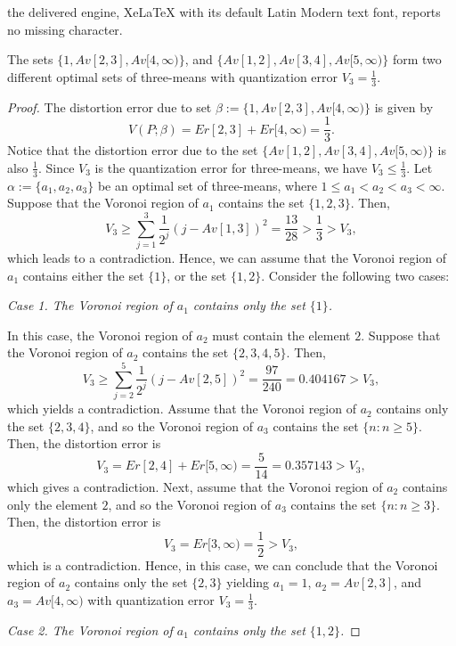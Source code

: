 \documentclass[10pt,a4paper]{amsart}
\newcommand{\ga}{\alpha}
\newcommand{\gb}{\beta}
\newcommand{\set}[1]{\{#1\}}%
\newcommand{\tit}{\textit}%
\begin{document}
the delivered engine, XeLaTeX with its default Latin Modern text font, reports no missing character.
\begin{prop} \label{prop111}
The sets $\set{1, Av[2,3], Av[4, \infty)}$, and $\set{Av[1,2], Av[3,4], Av[5, \infty)}$  form two different optimal sets of three-means with quantization error $V_3=\frac{1}{3}$.
\end{prop}

\begin{proof}
The distortion error due to set $\gb:=\set{1, Av[2,3], Av[4, \infty)}$ is given by
\[V(P; \gb)=Er[2,3]+Er[4, \infty)=\frac 13.\]
Notice that the distortion error due to the set $\set{Av[1,2], Av[3,4], Av[5, \infty)}$ is also $\frac 13$.
Since $V_3$ is the quantization error for three-means, we have $V_3\leq \frac 13$. Let $\ga:=\set{a_1, a_2, a_3}$ be an optimal set of three-means, where $1\leq a_1<a_2<a_3<\infty$. Suppose that the Voronoi region of $a_1$ contains the set $\set{1, 2, 3}$.
Then,
\[V_3\geq \sum_{j=1}^3 \frac 1 {2^j}(j-Av[1,3])^2 =\frac{13}{28}>\frac 13>V_3,\]
which leads to a contradiction. Hence, we can assume that the Voronoi region of $a_1$ contains either the set $\set{1}$, or the set $\set{1,2}$. Consider the following two cases:

\tit{Case 1. The Voronoi region of $a_1$ contains only the set $\set{1}$.}

In this case, the Voronoi region of $a_2$ must contain the element $2$. Suppose that the Voronoi region of $a_2$ contains the set $\set{2, 3, 4, 5}$. Then,
\[V_3\geq  \sum_{j=2}^5\frac 1 {2^j}(j-Av[2,5])^2 =\frac{97}{240}=0.404167>V_3,\]
which yields a contradiction. Assume that the Voronoi region of $a_2$ contains only the set $\set{2,3,4}$, and so the Voronoi region of $a_3$ contains the set $\set{n : n\geq 5}$. Then, the distortion error is
\[V_3=Er[2,4]+Er[5, \infty)=\frac 5 {14} =0.357143>V_3,\]
which gives a contradiction.
Next, assume that the Voronoi region of $a_2$ contains only the element $2$, and so the Voronoi region of $a_3$ contains the set $\set{n : n\geq3}$. Then, the distortion error is
\[V_3=Er[3, \infty) =\frac{1}{2}>V_3,\]
which is a contradiction.
Hence, in this case, we can conclude that the Voronoi region of $a_2$ contains only the set $\set{2,3}$ yielding $a_1=1$, $a_2=Av[2,3]$, and $a_3=Av[4, \infty)$ with quantization error $V_3=\frac 13$.

\tit{Case 2. The Voronoi region of $a_1$ contains only the set $\set{1,2}$.}


\end{proof}
\end{document}
